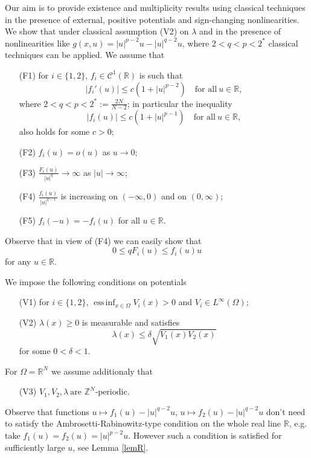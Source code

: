 \documentclass{scrartcl}
\newcommand{\cC}{{\mathcal C}}
\newcommand{\R}{\mathbb{R}}
\numberwithin{equation}{section}
\DeclareMathOperator{\essinf}{\mathrm{ess}\,\mathrm{inf}}
\begin{document}
Our aim is to provide existence and multiplicity results using classical techniques in the presence of external, positive potentials and sign-changing nonlinearities. We show that under classical assumption (V2) on $\lambda$ and in the presence of nonlinearities like $g(x,u) = |u|^{p-2} u - |u|^{q-2}u$, where $2 < q < p < 2^*$ classical techniques can be applied. We assume that
\begin{enumerate}
\item[(F1)] for $i \in \{1,2\}$, $f_i \in \cC^1 (\R)$ is such that
$$
|f_i' (u)| \leq c (1 + |u|^{p-2}) \quad \mbox{for all} \ u \in \R,
$$
where $2 < q < p < 2^* := \frac{2N}{N-2}$; in particular the inequality
$$
|f_i (u)| \leq c (1 + |u|^{p-1}) \quad \mbox{for all} \ u \in \R,
$$
also holds for some $c > 0$;
\item[(F2)] $f_i(u) = o(u)$ as $u \to 0$;
\item[(F3)] $\frac{F_i (u)}{|u|^q} \to \infty$ as $|u| \to \infty$;
\item[(F4)] $\frac{f_i (u)}{|u|^{q-1}}$ is increasing on $(-\infty, 0)$ and on $(0,\infty)$;
\item[(F5)] $f_i(-u) = - f_i(u)$ for all $u \in \R$.
\end{enumerate}

Observe that in view of (F4) we can easily show that
\begin{equation}\label{AR}
0 \leq q F_i (u) \leq f_i (u)u
\end{equation}
for any $u \in \R$.

We impose the following conditions on potentials
\begin{enumerate}
\item[(V1)] for $i\in \{1,2\}$, $\essinf_{x \in \Omega} V_i (x) > 0$ and $V_i \in L^\infty (\Omega)$;
\item[(V2)] $\lambda (x) \geq 0$ is measurable and satisfies
$$
\lambda(x) \leq \delta \sqrt{V_1(x) V_2(x)}
$$
for some $0 < \delta < 1$.
\end{enumerate}

For $\Omega = \R^N$ we assume additionaly that
\begin{enumerate}
\item[(V3)] $V_1, V_2, \lambda \ \mbox{are } \mathbb{Z}^N\mbox{-periodic.}$
\end{enumerate}

Observe that functions $u \mapsto f_1 (u) - |u|^{q-2}u$, $u \mapsto f_2 (u) - |u|^{q-2}u$ don't need to satisfy the Ambrosetti-Rabinowitz-type condition on the whole real line $\R$, e.g. take $f_1(u) = f_2(u) = |u|^{p-2}u$. However such a condition is satisfied for sufficiently large $u$, see Lemma \ref{lemR}.
\end{document}
